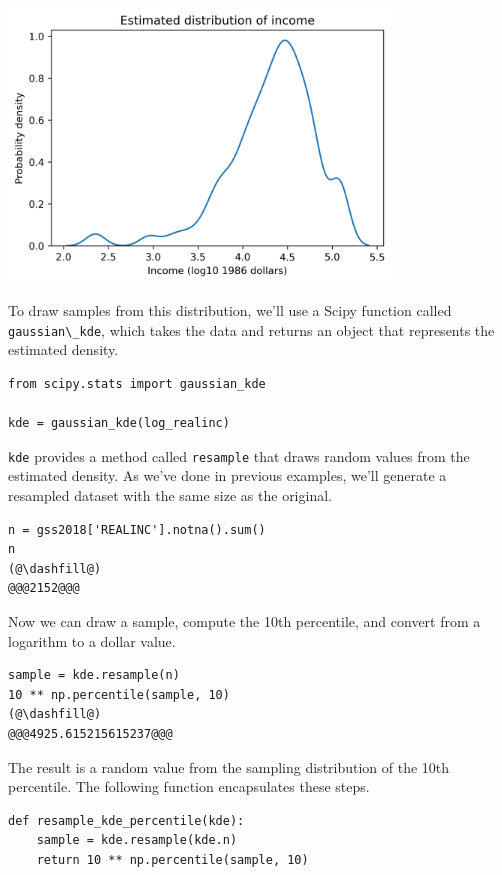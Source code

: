 \begin{center}
\includegraphics[width=4in]{chapters/12_bootstrap_files/12_bootstrap_120_0.png}
\end{center}

To draw samples from this distribution, we'll use a Scipy function
called \passthrough{\lstinline!gaussian\_kde!}, which takes the data and
returns an object that represents the estimated density.

\begin{lstlisting}[]
from scipy.stats import gaussian_kde

kde = gaussian_kde(log_realinc)
\end{lstlisting}

\passthrough{\lstinline!kde!} provides a method called
\passthrough{\lstinline!resample!} that draws random values from the
estimated density. As we've done in previous examples, we'll generate a
resampled dataset with the same size as the original.

\begin{lstlisting}[]
n = gss2018['REALINC'].notna().sum()
n
(@\dashfill@)
@@@2152@@@
\end{lstlisting}

Now we can draw a sample, compute the 10th percentile, and convert from
a logarithm to a dollar value.

\begin{lstlisting}[]
sample = kde.resample(n)
10 ** np.percentile(sample, 10)
(@\dashfill@)
@@@4925.615215615237@@@
\end{lstlisting}

The result is a random value from the sampling distribution of the 10th
percentile. The following function encapsulates these steps.

\begin{lstlisting}[]
def resample_kde_percentile(kde):
    sample = kde.resample(kde.n)
    return 10 ** np.percentile(sample, 10)
\end{lstlisting}


